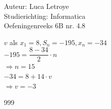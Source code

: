 \documentclass[a4paper]{article}
\begin{document}
  
\noindent \large Auteur: Luca Letroye \\
\noindent \large Studierichting: Informatica\\
\noindent \large Oefeningenreeks 6B nr. 4.8

\medskip
\normalsize

$v$ als $x_{1} = 8, S_n = -195, x_n = -34$\\

$-195 = \dfrac{8-34}{2}\cdot n $\\

$\Rightarrow n = 15$\\

$-34 = 8+14\cdot v$\\

$\Rightarrow v = -3$\\



\begin{thebibliography}{999}
\end{thebibliography}
\end{document}
